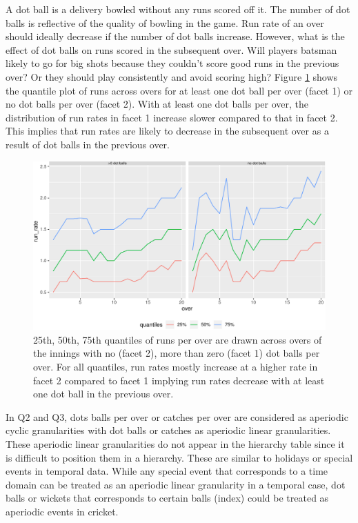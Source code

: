 \documentclass[12pt]{article}
\begin{document}
A dot ball is a delivery bowled without any runs scored off it. The number of dot balls is reflective of the quality of bowling in the game. Run rate of an over should ideally decrease if the number of dot balls increase. However, what is the effect of dot balls on runs scored in the subsequent over. Will players batsman likely to go for big shots because they couldn't score good runs in the previous over? Or they should play consistently and avoid scoring high? Figure \ref{fig:exdot} shows the quantile plot of runs across overs for at least one dot ball per over (facet 1) or no dot balls per over (facet 2).
With at least one dot balls per over, the distribution of run rates in facet 1 increase slower compared to that in facet 2. This implies that run rates are likely to decrease in the subsequent over as a result of dot balls in the previous over.

\begin{figure}[ht]

{\centering \includegraphics[width=\textwidth]{figure/exdot-1} 

}

\caption{25th, 50th, 75th quantiles of runs per over are drawn  across overs of the innings with no (facet 2), more than zero (facet 1) dot balls per over. For all quantiles, run rates mostly increase at a higher rate in facet 2 compared to facet 1 implying run rates decrease with at least one dot ball in the previous over.}\label{fig:exdot}
\end{figure}

In Q2 and Q3, dots balls per over or catches per over are considered as aperiodic cyclic granularities with dot balls or catches as aperiodic linear granularities. These aperiodic linear granularities do not appear in the hierarchy table since it is difficult to position them in a hierarchy. These are similar to holidays or special events in temporal data. While any special event that corresponds to a time domain can be treated as an aperiodic linear granularity in a temporal case, dot balls or wickets that corresponds to certain balls (index) could be treated as aperiodic events in cricket.
\end{document}
